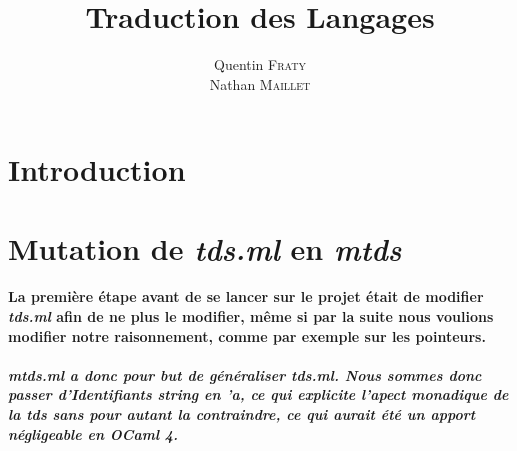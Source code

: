 \documentclass[french]{article}
\begin{document}
\title{\textbf{Traduction des Langages}}
\author{Quentin \textsc{Fraty}\\
        Nathan \textsc{Maillet}}
\date{}

\maketitle


\section{Introduction}

\section{Mutation de \emph{tds.ml} en \emph{mtds}}
\paragraph*{La première étape avant de se lancer sur le projet était de modifier \emph{tds.ml} afin de ne plus le modifier,
même si par la suite nous voulions modifier notre raisonnement, comme par exemple sur les pointeurs.}
\subparagraph*{\emph{mtds.ml} a donc pour but de généraliser \emph{tds.ml}. Nous sommes donc passer d'Identifiants \emph{string}
en \emph{'a}, ce qui explicite l'apect monadique de la tds sans pour autant la contraindre, ce qui aurait été un apport négligeable en OCaml 4.}
\end{document}
